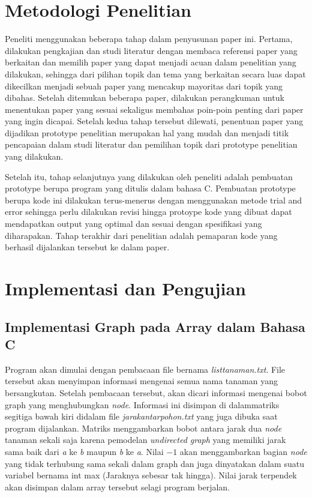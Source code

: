 \documentclass[conference]{IEEEtran}
\begin{document}
	\section{Metodologi Penelitian}
	Peneliti menggunakan beberapa tahap dalam penyusunan paper ini. Pertama, dilakukan pengkajian dan studi literatur dengan membaca referensi paper yang berkaitan dan memilih paper yang dapat menjadi acuan dalam penelitian yang dilakukan, sehingga dari pilihan topik dan tema yang berkaitan secara luas dapat dikecilkan menjadi sebuah paper yang mencakup mayoritas dari topik yang dibahas. Setelah ditemukan beberapa paper, dilakukan perangkuman untuk menentukan paper yang sesuai sekaligus membahas poin-poin penting dari paper yang ingin dicapai. Setelah kedua tahap tersebut dilewati, penentuan paper yang dijadikan prototype penelitian merupakan hal yang mudah dan menjadi titik pencapaian dalam studi literatur dan pemilihan topik dari prototype penelitian yang dilakukan.

	Setelah itu, tahap selanjutnya yang dilakukan oleh peneliti adalah pembuatan prototype berupa program yang ditulis dalam bahasa C. Pembuatan prototype berupa kode ini dilakukan terus-menerus dengan menggunakan metode trial and error sehingga perlu dilakukan revisi hingga protoype kode yang dibuat dapat mendapatkan output yang optimal dan sesuai dengan spesifikasi yang diharapakan. Tahap terakhir dari penelitian adalah pemaparan kode yang berhasil dijalankan tersebut ke dalam paper.
	\begin{figure}[htbp]
	\centering
	\scalebox{0.6}{}
	\end{figure}
	\section{Implementasi dan Pengujian}
	\subsection{Implementasi Graph pada Array dalam Bahasa C}
	Program akan dimulai dengan pembacaan file bernama \textit{listtanaman.txt}. File tersebut akan menyimpan informasi mengenai semua nama tanaman yang bersangkutan. Setelah pembacaan tersebut, akan dicari informasi mengenai bobot graph yang menghubungkan \textit{node}. Informasi ini disimpan di dalammatriks segitiga bawah kiri didalam file \textit{jarakantarpohon.txt} yang juga dibuka saat program dijalankan. Matriks menggambarkan bobot antara jarak dua \textit{node} tanaman sekali saja karena pemodelan \textit{undirected graph} yang memiliki jarak sama baik dari \textit{a} ke \textit{b} maupun \textit{b} ke \textit{a}. Nilai \begin{math} -1 \end{math} akan menggambarkan bagian \textit{node} yang tidak terhubung sama sekali dalam graph dan juga dinyatakan dalam suatu variabel bernama int max (Jaraknya sebesar tak hingga). Nilai jarak terpendek akan disimpan dalam array tersebut selagi program berjalan.
\end{document}
